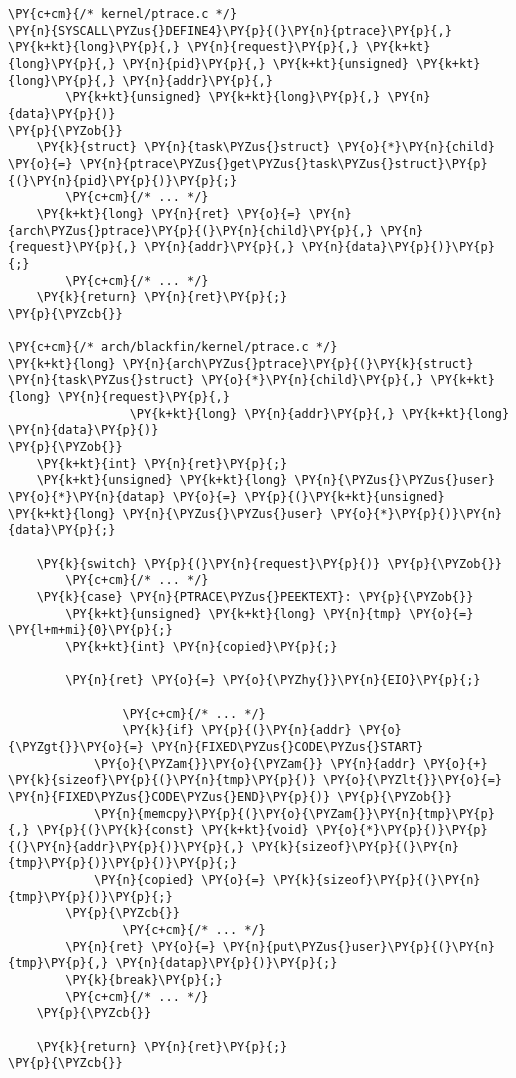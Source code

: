 \begin{Verbatim}[commandchars=\\\{\}]
\PY{c+cm}{/* kernel/ptrace.c */}
\PY{n}{SYSCALL\PYZus{}DEFINE4}\PY{p}{(}\PY{n}{ptrace}\PY{p}{,} \PY{k+kt}{long}\PY{p}{,} \PY{n}{request}\PY{p}{,} \PY{k+kt}{long}\PY{p}{,} \PY{n}{pid}\PY{p}{,} \PY{k+kt}{unsigned} \PY{k+kt}{long}\PY{p}{,} \PY{n}{addr}\PY{p}{,}
		\PY{k+kt}{unsigned} \PY{k+kt}{long}\PY{p}{,} \PY{n}{data}\PY{p}{)}
\PY{p}{\PYZob{}}
	\PY{k}{struct} \PY{n}{task\PYZus{}struct} \PY{o}{*}\PY{n}{child} \PY{o}{=} \PY{n}{ptrace\PYZus{}get\PYZus{}task\PYZus{}struct}\PY{p}{(}\PY{n}{pid}\PY{p}{)}\PY{p}{;}
        \PY{c+cm}{/* ... */}
	\PY{k+kt}{long} \PY{n}{ret} \PY{o}{=} \PY{n}{arch\PYZus{}ptrace}\PY{p}{(}\PY{n}{child}\PY{p}{,} \PY{n}{request}\PY{p}{,} \PY{n}{addr}\PY{p}{,} \PY{n}{data}\PY{p}{)}\PY{p}{;}
        \PY{c+cm}{/* ... */}
	\PY{k}{return} \PY{n}{ret}\PY{p}{;}
\PY{p}{\PYZcb{}}

\PY{c+cm}{/* arch/blackfin/kernel/ptrace.c */}
\PY{k+kt}{long} \PY{n}{arch\PYZus{}ptrace}\PY{p}{(}\PY{k}{struct} \PY{n}{task\PYZus{}struct} \PY{o}{*}\PY{n}{child}\PY{p}{,} \PY{k+kt}{long} \PY{n}{request}\PY{p}{,}
                 \PY{k+kt}{long} \PY{n}{addr}\PY{p}{,} \PY{k+kt}{long} \PY{n}{data}\PY{p}{)}
\PY{p}{\PYZob{}}
	\PY{k+kt}{int} \PY{n}{ret}\PY{p}{;}
	\PY{k+kt}{unsigned} \PY{k+kt}{long} \PY{n}{\PYZus{}\PYZus{}user} \PY{o}{*}\PY{n}{datap} \PY{o}{=} \PY{p}{(}\PY{k+kt}{unsigned} \PY{k+kt}{long} \PY{n}{\PYZus{}\PYZus{}user} \PY{o}{*}\PY{p}{)}\PY{n}{data}\PY{p}{;}

	\PY{k}{switch} \PY{p}{(}\PY{n}{request}\PY{p}{)} \PY{p}{\PYZob{}}
        \PY{c+cm}{/* ... */}
	\PY{k}{case} \PY{n}{PTRACE\PYZus{}PEEKTEXT}: \PY{p}{\PYZob{}}
		\PY{k+kt}{unsigned} \PY{k+kt}{long} \PY{n}{tmp} \PY{o}{=} \PY{l+m+mi}{0}\PY{p}{;}
		\PY{k+kt}{int} \PY{n}{copied}\PY{p}{;}

		\PY{n}{ret} \PY{o}{=} \PY{o}{\PYZhy{}}\PY{n}{EIO}\PY{p}{;}

                \PY{c+cm}{/* ... */}
                \PY{k}{if} \PY{p}{(}\PY{n}{addr} \PY{o}{\PYZgt{}}\PY{o}{=} \PY{n}{FIXED\PYZus{}CODE\PYZus{}START}
		    \PY{o}{\PYZam{}}\PY{o}{\PYZam{}} \PY{n}{addr} \PY{o}{+} \PY{k}{sizeof}\PY{p}{(}\PY{n}{tmp}\PY{p}{)} \PY{o}{\PYZlt{}}\PY{o}{=} \PY{n}{FIXED\PYZus{}CODE\PYZus{}END}\PY{p}{)} \PY{p}{\PYZob{}}
			\PY{n}{memcpy}\PY{p}{(}\PY{o}{\PYZam{}}\PY{n}{tmp}\PY{p}{,} \PY{p}{(}\PY{k}{const} \PY{k+kt}{void} \PY{o}{*}\PY{p}{)}\PY{p}{(}\PY{n}{addr}\PY{p}{)}\PY{p}{,} \PY{k}{sizeof}\PY{p}{(}\PY{n}{tmp}\PY{p}{)}\PY{p}{)}\PY{p}{;}
			\PY{n}{copied} \PY{o}{=} \PY{k}{sizeof}\PY{p}{(}\PY{n}{tmp}\PY{p}{)}\PY{p}{;}
		\PY{p}{\PYZcb{}}
                \PY{c+cm}{/* ... */}
		\PY{n}{ret} \PY{o}{=} \PY{n}{put\PYZus{}user}\PY{p}{(}\PY{n}{tmp}\PY{p}{,} \PY{n}{datap}\PY{p}{)}\PY{p}{;}
		\PY{k}{break}\PY{p}{;}
        \PY{c+cm}{/* ... */}
	\PY{p}{\PYZcb{}}

	\PY{k}{return} \PY{n}{ret}\PY{p}{;}
\PY{p}{\PYZcb{}}
\end{Verbatim}
